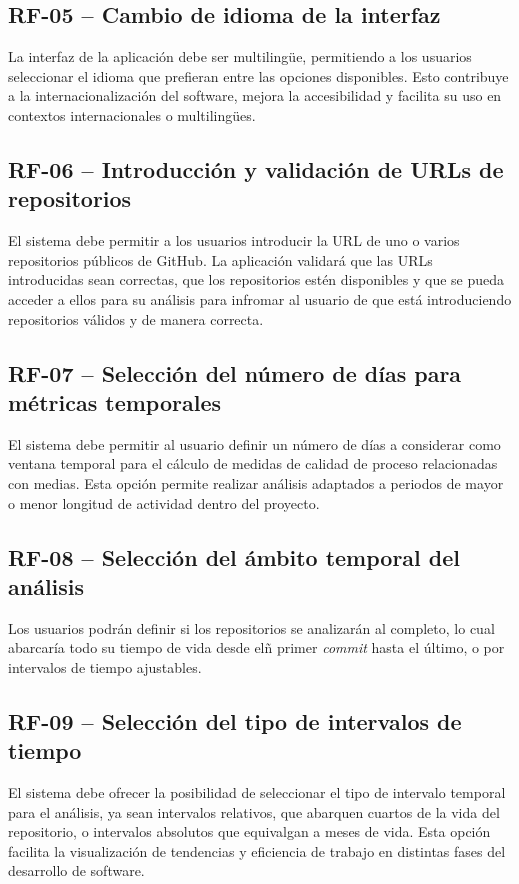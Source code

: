 \subsection*{RF-05 – Cambio de idioma de la interfaz}
La interfaz de la aplicación debe ser multilingüe, permitiendo a los usuarios seleccionar el idioma que prefieran entre las opciones disponibles. Esto contribuye a la internacionalización del software, mejora la accesibilidad y facilita su uso en contextos internacionales o multilingües.

\subsection*{RF-06 – Introducción y validación de URLs de repositorios}
El sistema debe permitir a los usuarios introducir la URL de uno o varios repositorios públicos de GitHub. La aplicación validará que las URLs introducidas sean correctas, que los repositorios estén disponibles y que se pueda acceder a ellos para su análisis para infromar al usuario de que está introduciendo repositorios válidos y de manera correcta.

\subsection*{RF-07 – Selección del número de días para métricas temporales}
El sistema debe permitir al usuario definir un número de días a considerar como ventana temporal para el cálculo de medidas de calidad de proceso relacionadas con medias. Esta opción permite realizar análisis adaptados a periodos de mayor o menor longitud de actividad dentro del proyecto.

\subsection*{RF-08 – Selección del ámbito temporal del análisis}
Los usuarios podrán definir si los repositorios se analizarán al completo, lo cual abarcaría todo su tiempo de vida desde elñ primer \textit{commit} hasta el último, o por intervalos de tiempo ajustables.

\subsection*{RF-09 – Selección del tipo de intervalos de tiempo}
El sistema debe ofrecer la posibilidad de seleccionar el tipo de intervalo temporal para el análisis, ya sean intervalos relativos, que abarquen cuartos de la vida del repositorio, o intervalos absolutos que equivalgan a meses de vida. Esta opción facilita la visualización de tendencias y eficiencia de trabajo en distintas fases del desarrollo de software.

